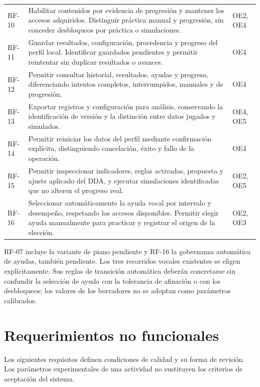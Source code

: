 \begin{longtable}{p{}p{}p{}}
RF-10 & Habilitar contenidos por evidencia de progresión y mantener los accesos adquiridos. Distinguir práctica manual y progresión, sin conceder desbloqueos por práctica o simulaciones. & OE2, OE4 \\
RF-11 & Guardar resultados, configuración, procedencia y progreso del perfil local. Identificar guardados pendientes y permitir reintentar sin duplicar resultados o avances. & OE4 \\
RF-12 & Permitir consultar historial, resultados, ayudas y progreso, diferenciando intentos completos, interrumpidos, manuales y de progresión. & OE4 \\
RF-13 & Exportar registros y configuración para análisis, conservando la identificación de versión y la distinción entre datos jugados y simulados. & OE4, OE5 \\
RF-14 & Permitir reiniciar los datos del perfil mediante confirmación explícita, distinguiendo cancelación, éxito y fallo de la operación. & OE4 \\
RF-15 & Permitir inspeccionar indicadores, reglas activadas, propuesta y ajuste aplicado del DDA, y ejecutar simulaciones identificadas que no alteren el progreso real. & OE2, OE5 \\
RF-16 & Seleccionar automáticamente la ayuda vocal por intervalo y desempeño, respetando los accesos disponibles. Permitir elegir ayuda manualmente para practicar y registrar el origen de la elección. & OE2, OE3 \\
\end{longtable}
\endgroup

RF-07 incluye la variante de piano pendiente y RF-16 la gobernanza automática
de ayudas, también pendiente. Los tres recorridos vocales existentes se eligen
explícitamente. Sus reglas de transición automática deberán concretarse sin
confundir la selección de ayuda con la tolerancia de afinación o con los
desbloqueos; los valores de los borradores no se adoptan como parámetros calibrados.

\section{Requerimientos no funcionales}
Los siguientes requisitos definen condiciones de calidad y su forma de revisión.
Los parámetros experimentales de una actividad no sustituyen los criterios de
aceptación del sistema.

